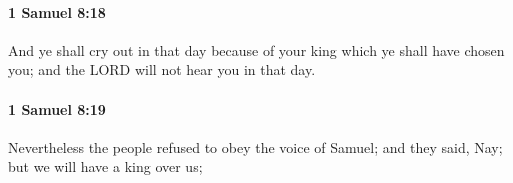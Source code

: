 		\paragraph{1 Samuel 8:18} %
			\label{1SAMUEL-8-18}

			And ye shall cry out in that day because of your king which ye shall have chosen you; and the LORD will not hear you in that day.


		\paragraph{1 Samuel 8:19} %
			\label{1SAMUEL-8-19}

			Nevertheless the people refused to obey the voice of Samuel; and they said, Nay; but we will have a king over us;


